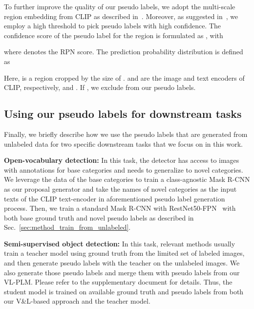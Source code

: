 \documentclass[runningheads]{llncs}
\begin{document}
To further improve the quality of our pseudo labels, we adopt the multi-scale region embedding from CLIP as described in~\cite{gu_iclr_22}.  Moreover, as suggested in~\cite{sohn2020detection}, we employ a high threshold to pick pseudo labels with high confidence.
The confidence score of the pseudo label for the region  is formulated as , with

where  denotes the RPN score. The prediction probability distribution  is defined as

Here,  is a region cropped by  the size of .  and  are the image and text encoders of CLIP, respectively, and .
If , we exclude  from our pseudo labels.



\subsection{Using our pseudo labels for downstream tasks}
\label{sec:method_pl_for_specific_tasks}

Finally, we briefly describe how we use the pseudo labels that are generated from unlabeled data for two specific downstream tasks that we focus on in this work.

\vspace{1mm}
\noindent \textbf{Open-vocabulary detection:}
In this task, the detector has access to images with annotations for base categories and needs to generalize to novel categories.  
We leverage the data of the base categories to train a class-agnostic Mask R-CNN as our proposal generator and take the names of novel categories as the input texts of the CLIP text-encoder in aforementioned pseudo label generation process.  
Then, we train a standard Mask R-CNN with RestNet50-FPN~\cite{lin_cvpr_17_fpn} with both base ground truth and novel pseudo labels as described in Sec.~\ref{sec:method_train_from_unlabeled}.


\vspace{1mm}
\noindent \textbf{Semi-supervised object detection:}
In this task, relevant methods usually train a teacher model using ground truth from the limited set of labeled images, and then generate pseudo labels with the teacher on the unlabeled images.  We also generate those pseudo labels and merge them with pseudo labels from our VL-PLM.
Please refer to the supplementary document for details.
Thus, the student model is trained on available ground truth and pseudo labels from both our V\&L-based approach and the teacher model.
\end{document}

